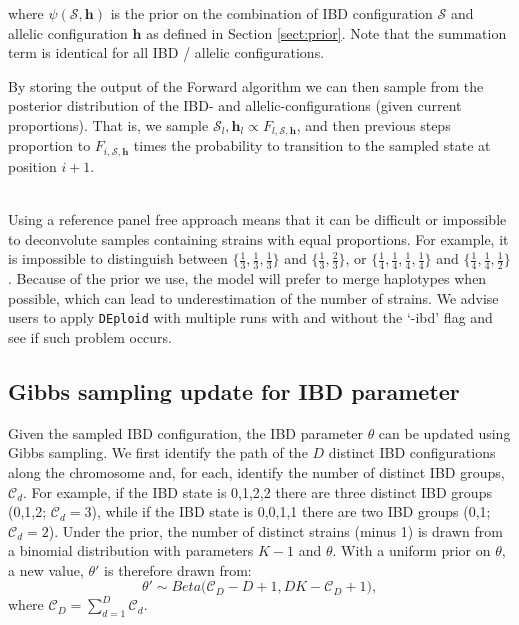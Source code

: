 \documentclass[9pt]{article}
\begin{document}
\noindent where $\psi(\mathcal{S},\mathbf{h})$ is the prior on the combination of IBD configuration $\mathcal{S}$ and allelic configuration $\mathbf{h}$ as defined in Section \ref{sect:prior}.  Note that the summation term is identical for all IBD / allelic configurations.

By storing the output of the Forward algorithm we can then sample from the posterior distribution of the IBD- and allelic-configurations (given current proportions).  That is, we sample $\mathcal{S}_l,\mathbf{h}_l \propto F_{l,\mathcal{S}, \mathbf{h}}$, and then previous steps proportion to $F_{i,\mathcal{S}, \mathbf{h}}$ times the probability to transition to the sampled state at position $i+1$.

\vspace{.2cm}

\\
Using a reference panel free approach means that it can be difficult or impossible to deconvolute samples containing strains with equal proportions. For example, it is impossible to distinguish between $\{\frac{1}{3},\frac{1}{3},\frac{1}{3}\}$ and $\{\frac{1}{3},\frac{2}{3}\}$, or
$\{\frac{1}{4},\frac{1}{4}, \frac{1}{4}, \frac{1}{4}\}$ and $\{\frac{1}{4},\frac{1}{4}, \frac{1}{2}\}$. Because of the prior we use, the model will prefer to merge haplotypes when possible, which can lead to underestimation of the number of strains. We advise users to apply {\tt DEploid} with multiple runs with and without the `-ibd' flag and see if such problem occurs.


\subsection{Gibbs sampling update for IBD parameter}

Given the sampled IBD configuration, the IBD parameter $\theta$ can be updated using Gibbs sampling.  We first identify the path of the $D$ distinct IBD configurations along the chromosome and, for each, identify the number of distinct IBD groups, $\mathcal{C}_d$.  For example, if the IBD state is 0,1,2,2 there are three distinct IBD groups (0,1,2; $\mathcal{C}_d = 3$), while if the IBD state is 0,0,1,1 there are two IBD groups (0,1; $\mathcal{C}_d = 2$).  Under the prior, the number of distinct strains (minus 1) is drawn from a binomial distribution with parameters $K-1$ and $\theta$.  With a uniform prior on $\theta$, a new value, $\theta'$ is therefore drawn from:
\begin{equation*}
    \theta' \sim Beta \big(\mathcal{C}_D - D + 1, D K-\mathcal{C}_D + 1\big),
\end{equation*}
\noindent where $\mathcal{C}_D = \sum_{d=1}^D \mathcal{C}_d$.
\end{document}
